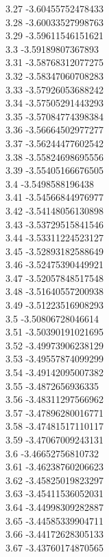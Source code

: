 {3.27	-3.60455752478433\\
3.28	-3.60033527998763\\
3.29	-3.59611546151621\\
3.3	-3.59189807367893\\
3.31	-3.58768312077275\\
3.32	-3.58347060708283\\
3.33	-3.57926053688242\\
3.34	-3.57505291443293\\
3.35	-3.57084774398384\\
3.36	-3.56664502977277\\
3.37	-3.56244477602542\\
3.38	-3.55824698695556\\
3.39	-3.55405166676505\\
3.4	-3.5498588196438\\
3.41	-3.54566844976977\\
3.42	-3.54148056130898\\
3.43	-3.53729515841546\\
3.44	-3.53311224523127\\
3.45	-3.52893182588649\\
3.46	-3.52475390449921\\
3.47	-3.52057848517548\\
3.48	-3.51640557200938\\
3.49	-3.51223516908293\\
3.5	-3.50806728046614\\
3.51	-3.50390191021695\\
3.52	-3.49973906238129\\
3.53	-3.49557874099299\\
3.54	-3.49142095007382\\
3.55	-3.4872656936335\\
3.56	-3.48311297566962\\
3.57	-3.47896280016771\\
3.58	-3.47481517110117\\
3.59	-3.47067009243131\\
3.6	-3.46652756810732\\
3.61	-3.46238760206623\\
3.62	-3.45825019823297\\
3.63	-3.45411536052031\\
3.64	-3.44998309282887\\
3.65	-3.44585339904711\\
3.66	-3.44172628305133\\
3.67	-3.43760174870565\\
}
